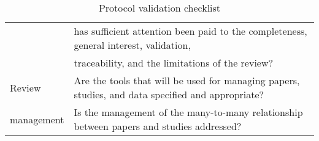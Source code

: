 \begin{table}
\begin{center}
{\begin{tabular}{|l||l|}
                                & has sufficient attention been paid to the completeness, general interest, validation,      \\
                                & traceability, and the limitations of the review?                                            \\
                    \hline
                    Review      & Are the tools that will be used for managing papers, studies, and data specified and appropriate?\\
                    management  & Is the management of the many-to-many relationship between papers and studies addressed? \\
                    \hline
            \end{tabular}}
    \end{center}
    \caption{Protocol validation checklist}
    \label{table:protocolValidation}
\end{table}
